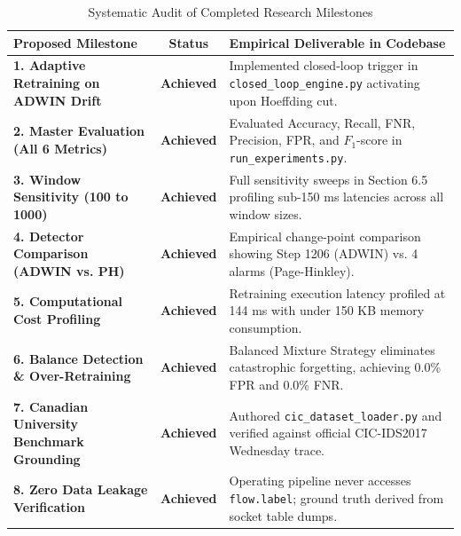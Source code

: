 \documentclass[12pt,a4paper,oneside]{report}
\begin{document}
\begin{table}[H]
\caption{Systematic Audit of Completed Research Milestones}
\centering
\begin{tabularx}{\textwidth}{l c X}
\toprule
\textbf{Proposed Milestone} & \textbf{Status} & \textbf{Empirical Deliverable in Codebase} \\
\midrule
\textbf{1. Adaptive Retraining on ADWIN Drift} & \textbf{Achieved} & Implemented closed-loop trigger in \texttt{closed\_loop\_engine.py} activating upon Hoeffding cut. \\
\addlinespace
\textbf{2. Master Evaluation (All 6 Metrics)} & \textbf{Achieved} & Evaluated Accuracy, Recall, FNR, Precision, FPR, and $F_1$-score in \texttt{run\_experiments.py}. \\
\addlinespace
\textbf{3. Window Sensitivity (100 to 1000)} & \textbf{Achieved} & Full sensitivity sweeps in Section 6.5 profiling sub-150 ms latencies across all window sizes. \\
\addlinespace
\textbf{4. Detector Comparison (ADWIN vs. PH)} & \textbf{Achieved} & Empirical change-point comparison showing Step 1206 (ADWIN) vs. 4 alarms (Page-Hinkley). \\
\addlinespace
\textbf{5. Computational Cost Profiling} & \textbf{Achieved} & Retraining execution latency profiled at 144 ms with under 150 KB memory consumption. \\
\addlinespace
\textbf{6. Balance Detection \& Over-Retraining} & \textbf{Achieved} & Balanced Mixture Strategy eliminates catastrophic forgetting, achieving 0.0\% FPR and 0.0\% FNR. \\
\addlinespace
\textbf{7. Canadian University Benchmark Grounding} & \textbf{Achieved} & Authored \texttt{cic\_dataset\_loader.py} and verified against official CIC-IDS2017 Wednesday trace. \\
\addlinespace
\textbf{8. Zero Data Leakage Verification} & \textbf{Achieved} & Operating pipeline never accesses \texttt{flow.label}; ground truth derived from socket table dumps. \\
\bottomrule
\end{tabularx}
\label{tab:commitments_final}
\end{table}
\end{document}
